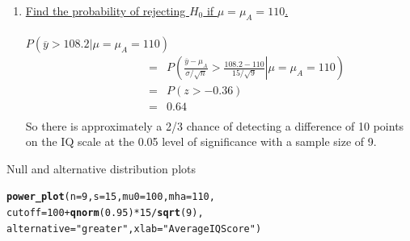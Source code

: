 \documentclass[10pt]{beamer}\usepackage[]{graphicx}\usepackage[]{color}
\makeatletter
\newcommand{\hlnum}[1]{\textcolor[rgb]{0.686,0.059,0.569}{#1}}%
\newcommand{\hlstr}[1]{\textcolor[rgb]{0.192,0.494,0.8}{#1}}%
\newcommand{\hlopt}[1]{\textcolor[rgb]{0,0,0}{#1}}%
\newcommand{\hlstd}[1]{\textcolor[rgb]{0.345,0.345,0.345}{#1}}%
\newcommand{\hlkwc}[1]{\textcolor[rgb]{0.333,0.667,0.333}{#1}}%
\newcommand{\hlkwd}[1]{\textcolor[rgb]{0.737,0.353,0.396}{\textbf{#1}}}%
\newenvironment{kframe}{%
 \def\at@end@of@kframe{}%
 \ifinner\ifhmode%
  \def\at@end@of@kframe{\end{minipage}}%
  \begin{minipage}{\columnwidth}%
 \fi\fi%
 \def\FrameCommand##1{\hskip\@totalleftmargin \hskip-\fboxsep
 \colorbox{shadecolor}{##1}\hskip-\fboxsep
     \hskip-\linewidth \hskip-\@totalleftmargin \hskip\columnwidth}%
 \MakeFramed {\advance\hsize-\width
   \@totalleftmargin\z@ \linewidth\hsize
   \@setminipage}}%
 {\par\unskip\endMakeFramed%
 \at@end@of@kframe}
\newenvironment{knitrout}{}{} %
\makeatother
\begin{document}
{	\begin{enumerate}
		\item[3.] \underline{Find the probability of rejecting $H_0$ if
			$\mu=\mu_A=110$.}\\ \ \\
		$P(\overline{y} > 108.2|\mu=\mu_A=110) $
		\begin{eqnarray*} \qquad \qquad & = &
			P\left(\left.\frac{\overline{y}-\mu_A}{\sigma/\sqrt{n}}
			> \frac{108.2-110}{15/\sqrt{9}}\right|\mu=\mu_A=110\right)\\
			& = & P\left(z > -0.36\right)\\
			& = & 0.64\\
		\end{eqnarray*}
		So there is approximately a 2/3 chance of detecting a difference of
		10 points on the IQ scale at the 0.05 level of significance with a
		sample size of 9.
	\end{enumerate}
} 


\begin{frame}[fragile]{Null and alternative distribution plots}
\begin{knitrout}\tiny
{}\color{fgcolor}\begin{kframe}
\begin{alltt}
\hlkwd{power_plot}\hlstd{(}\hlkwc{n} \hlstd{=} \hlnum{9}\hlstd{,} \hlkwc{s} \hlstd{=} \hlnum{15}\hlstd{,} \hlkwc{mu0} \hlstd{=} \hlnum{100}\hlstd{,} \hlkwc{mha} \hlstd{=} \hlnum{110}\hlstd{,}
\hlkwc{cutoff} \hlstd{=} \hlnum{100} \hlopt{+} \hlkwd{qnorm}\hlstd{(}\hlnum{0.95}\hlstd{)} \hlopt{*} \hlnum{15} \hlopt{/} \hlkwd{sqrt}\hlstd{(}\hlnum{9}\hlstd{),}
\hlkwc{alternative} \hlstd{=} \hlstr{"greater"}\hlstd{,} \hlkwc{xlab} \hlstd{=} \hlstr{"Average IQ Score"}\hlstd{)}
\end{alltt}


{\ttfamily\noindent\bfseries{}}\end{kframe}
\end{knitrout}
\end{frame}
\end{document}

